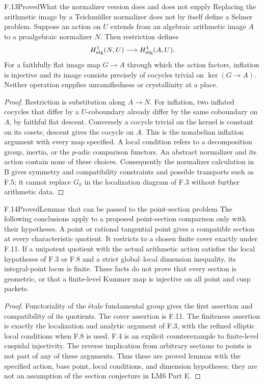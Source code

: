 \begin{statement}{F.13}{Proved}{What the normalizer version does and does not supply}
Replacing the arithmetic image by a Teichm\"uller
normalizer does not by itself define a Selmer problem.
Suppose an action on $U$ extends from an algebraic
arithmetic image $A$ to a proalgebraic normalizer $N$.
Then restriction defines
\[
 H^1_{\rm alg}(N,U)\longrightarrow H^1_{\rm alg}(A,U).
\]
For a faithfully flat image map $G\to A$ through which
the action factors, inflation is injective and its
image consists precisely of cocycles trivial on
$\ker(G\to A)$. Neither operation supplies
unramifiedness or crystallinity at a place.
\end{statement}
\begin{proof}
Restriction is substitution along $A\to N$.
For inflation, two inflated cocycles that differ by
a $U$-coboundary already differ by the same coboundary
on $A$, by faithful flat descent. Conversely a
cocycle trivial on the kernel is constant on its
cosets; descent gives the cocycle on $A$. This is
the nonabelian inflation argument with every map
specified. A local condition refers to a decomposition
group, inertia, or the $p$-adic comparison functors.
An abstract normalizer and its action contain none
of these choices. Consequently the normalizer
calculation in B gives symmetry and compatibility
constraints and possible transports such as F.5;
it cannot replace $G_k$ in the localization diagram
of F.3 without further arithmetic data.
\end{proof}

\begin{statement}{F.14}{Proved}{Lemmas that can be passed to the point-section problem}
The following conclusions apply to a proposed
point-section comparison only with their hypotheses.
A point or rational tangential point gives a
compatible section at every characteristic quotient.
It restricts to a chosen finite cover exactly under
F.11. If a unipotent quotient with the actual
arithmetic action satisfies the local hypotheses
of F.3 or F.8 and a strict global--local dimension
inequality, its integral-point locus is finite.
These facts do not prove that every section is
geometric, or that a finite-level Kummer map is
injective on all point and cusp packets.
\end{statement}
\begin{proof}
Functoriality of the étale fundamental group gives
the first assertion and compatibility of its
quotients. The cover assertion is F.11.
The finiteness assertion is exactly the localization
and analytic argument of F.3, with the refined
elliptic local conditions when F.8 is used. F.4
is an explicit counterexample to finite-level
cuspidal injectivity. The reverse implication
from arbitrary sections to points is not part
of any of these arguments. Thus these are
proved lemmas with the specified action,
base point, local conditions, and dimension
hypotheses; they are not an assumption of
the section conjecture in LM6 Part E.
\end{proof}

